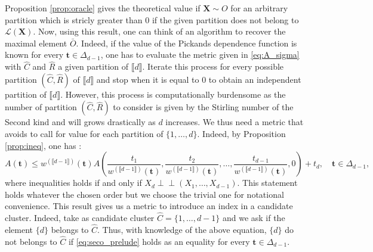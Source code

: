 \documentclass[11pt]{article}
\newcommand{\indep}{\perp \!\!\! \perp}
\begin{document}
	Proposition \ref{prop:oracle} gives the theoretical value if $\textbf{X} \sim O$ for an arbitrary partition which is stricly greater than $0$ if the given partition does not belong to $\mathcal{L}(\textbf{X})$. Now, using this result, one can think of an algorithm to recover the maximal element $\bar{O}$. Indeed, if the value of the Pickands dependence function is known for every $\textbf{t} \in \Delta_{d-1}$, one has to evaluate the metric given in \eqref{eq:A_sigma} with $\hat{C}$ and $\hat{R}$ a given partition of $\llbracket d \rrbracket$. Iterate this process for every possible partition $(\hat{C}, \hat{R})$ of $\llbracket d \rrbracket$ and stop when it is equal to $0$ to obtain an independent partition of $\llbracket d \rrbracket$. However, this process is computationally burdensome as the number of partition $(\hat{C}, \hat{R})$ to consider is given by the Stirling number of the Second kind and will grows drastically as $d$ increases. We thus need a metric that avoids to call for value for each partition of $\{1,\dots,d\}$. Indeed, by Proposition \ref{prop:ineq}, one has :
	\begin{equation}
		\label{eq:seco_prelude}
		A(\textbf{t}) \leq w^{(\llbracket d-1 \rrbracket)}(\textbf{t}) A\left(\frac{t_1}{w^{(\llbracket d-1 \rrbracket)}(\textbf{t})}, \frac{t_2}{w^{(\llbracket d-1 \rrbracket)}(\textbf{t})} ,\dots, \frac{t_{d-1}}{w^{(\llbracket d-1 \rrbracket)}(\textbf{t})}, 0\right) + t_d , \quad \textbf{t} \in \Delta_{d-1},
	\end{equation}
	where inequalities holds if and only if $X_d \indep (X_1,\dots, X_{d-1})$. This statement holds whatever the chosen order but we choose the trivial one for notational convenience. This result gives us a metric to introduce an index in a candidate cluster. Indeed, take as candidate cluster $\hat{C} = \{1,\dots,d-1\}$ and we ask if the element $\{d\}$ belongs to $\hat{C}$. Thus, with knowledge of the above equation, $\{d\}$ do not belongs to $\hat{C}$ if \eqref{eq:seco_prelude} holds as an equality for every $\textbf{t} \in \Delta_{d-1}$.
	
\end{document}
